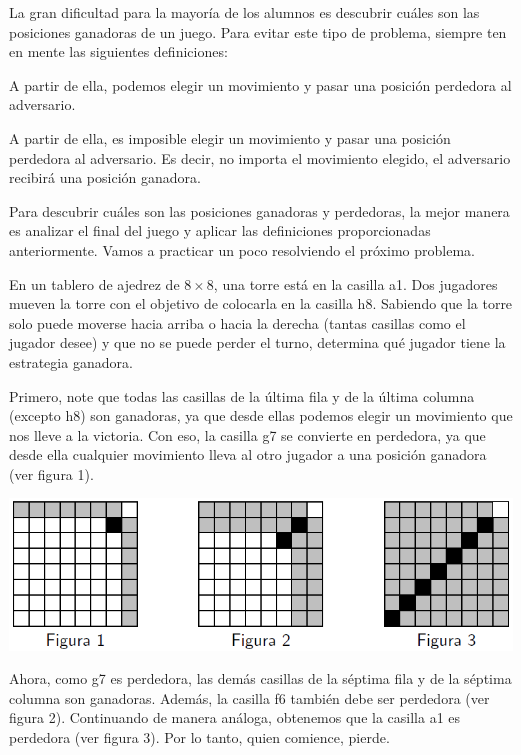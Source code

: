 \documentclass[11pt]{scrartcl}
\begin{document}
La gran dificultad para la mayoría de los alumnos es descubrir cuáles son las posiciones ganadoras de un juego. Para evitar este tipo de problema, siempre ten en mente las siguientes definiciones:
\begin{definition} A partir de ella, podemos elegir un movimiento y pasar una posición perdedora al adversario.
\end{definition}
\begin{definition} A partir de ella, es imposible elegir un movimiento y pasar una posición perdedora al adversario. Es decir, no importa el movimiento elegido, el adversario recibirá una posición ganadora.
\end{definition}

Para descubrir cuáles son las posiciones ganadoras y perdedoras, la mejor manera es analizar el final del juego y aplicar las definiciones proporcionadas anteriormente. Vamos a practicar un poco resolviendo el próximo problema.

\begin{example}
En un tablero de ajedrez de $8 \times 8$, una torre está en la casilla a1. Dos jugadores mueven la torre con el objetivo de colocarla en la casilla h8. Sabiendo que la torre solo puede moverse hacia arriba o hacia la derecha (tantas casillas como el jugador desee) y que no se puede perder el turno, determina qué jugador tiene la estrategia ganadora.
\end{example}
Primero, note que todas las casillas de la última fila y de la última columna (excepto h8) son ganadoras, ya que desde ellas podemos elegir un movimiento que nos lleve a la victoria. Con eso, la casilla g7 se convierte en perdedora, ya que desde ella cualquier movimiento lleva al otro jugador a una posición ganadora (ver figura 1).
\begin{center}
    \includegraphics[scale=0.8]{images/clase_06_eje4.png}
\end{center}
Ahora, como g7 es perdedora, las demás casillas de la séptima fila y de la séptima columna son ganadoras. Además, la casilla f6 también debe ser perdedora (ver figura 2). Continuando de manera análoga, obtenemos que la casilla a1 es perdedora (ver figura 3). Por lo tanto, quien comience, pierde.
\end{document}
